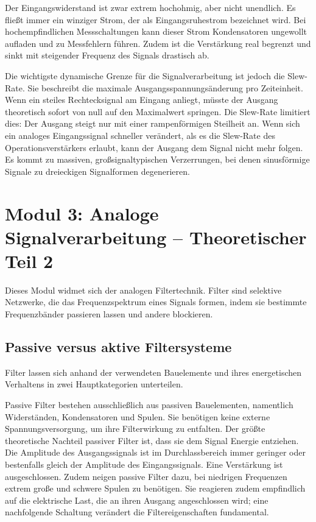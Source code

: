 \documentclass[11pt,a4paper]{article}
\begin{document}
Der Eingangswiderstand ist zwar extrem hochohmig, aber nicht unendlich. Es fließt immer ein winziger Strom, der als Eingangsruhestrom bezeichnet wird. Bei hochempfindlichen Messschaltungen kann dieser Strom Kondensatoren ungewollt aufladen und zu Messfehlern führen. Zudem ist die Verstärkung real begrenzt und sinkt mit steigender Frequenz des Signals drastisch ab.

Die wichtigste dynamische Grenze für die Signalverarbeitung ist jedoch die Slew-Rate. Sie beschreibt die maximale Ausgangsspannungsänderung pro Zeiteinheit. Wenn ein steiles Rechtecksignal am Eingang anliegt, müsste der Ausgang theoretisch sofort von null auf den Maximalwert springen. Die Slew-Rate limitiert dies: Der Ausgang steigt nur mit einer rampenförmigen Steilheit an. Wenn sich ein analoges Eingangssignal schneller verändert, als es die Slew-Rate des Operationsverstärkers erlaubt, kann der Ausgang dem Signal nicht mehr folgen. Es kommt zu massiven, großsignaltypischen Verzerrungen, bei denen sinusförmige Signale zu dreieckigen Signalformen degenerieren.

\newpage

\section{Modul 3: Analoge Signalverarbeitung -- Theoretischer Teil 2}

Dieses Modul widmet sich der analogen Filtertechnik. Filter sind selektive Netzwerke, die das Frequenzspektrum eines Signals formen, indem sie bestimmte Frequenzbänder passieren lassen und andere blockieren.

\subsection{Passive versus aktive Filtersysteme}

Filter lassen sich anhand der verwendeten Bauelemente und ihres energetischen Verhaltens in zwei Hauptkategorien unterteilen.

Passive Filter bestehen ausschließlich aus passiven Bauelementen, namentlich Widerständen, Kondensatoren und Spulen. Sie benötigen keine externe Spannungsversorgung, um ihre Filterwirkung zu entfalten. Der größte theoretische Nachteil passiver Filter ist, dass sie dem Signal Energie entziehen. Die Amplitude des Ausgangssignals ist im Durchlassbereich immer geringer oder bestenfalls gleich der Amplitude des Eingangssignals. Eine Verstärkung ist ausgeschlossen. Zudem neigen passive Filter dazu, bei niedrigen Frequenzen extrem große und schwere Spulen zu benötigen. Sie reagieren zudem empfindlich auf die elektrische Last, die an ihren Ausgang angeschlossen wird; eine nachfolgende Schaltung verändert die Filtereigenschaften fundamental.
\end{document}
